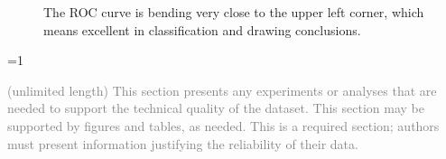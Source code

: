 \documentclass[fleqn,10pt]{wlscirep}
\newcommand{\ifinstruction}{0} %
\begin{document}
\begin{figure}


\caption{\label{fig-ccf-ROC}The ROC curve is bending very close to the
upper left corner, which means excellent in classification and drawing
conclusions.}

\end{figure}%

\ifnum \ifinstruction=1

\textcolor{gray}{(unlimited length) This section presents any experiments or analyses that are needed to support the technical quality of the dataset. This section may be supported by figures and tables, as needed. This is a required section; authors must present information justifying the reliability of their data.}
\end{document}
